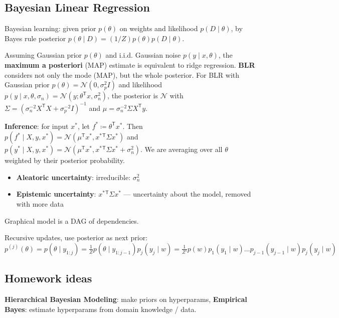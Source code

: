 \documentclass[11pt,landscape,a4paper,fleqn]{article}
\newcommand*{\tran}{^{\mathsf{T}}} %
\begin{document}
\begin{multicols*}{4}
\section{Bayesian Linear Regression}

Bayesian learning: given prior \(p(\theta)\) on weights and likelihood \(p(D \mid \theta)\),
by Bayes rule posterior \(p(\theta \mid D) = (1 / Z) p(\theta) p(D \mid \theta)\).

Assuming Gaussian prior \(p(\theta)\) and i.i.d. Gaussian noise \(p(y \mid x, \theta)\),
the \textbf{maximum a posteriori} (MAP) estimate is equivalent to ridge regression.
\textbf{BLR} considers not only the mode (MAP), but the whole posterior.
For BLR with Gaussian prior \(p(\theta) = \mathcal{N}(0, \sigma_p^2 I)\)
and likelihood \(p(y \mid x, \theta, \sigma_n) = \mathcal{N}(y; \theta\tran x, \sigma_n^2)\),
the posterior is \(\mathcal{N}\) with 
\(\Sigma = (\sigma_n^{-2} X\tran X + \sigma_p^{-2} I)^{-1}\) and
\(\mu = \sigma_n^{-2} \Sigma X\tran y\).

\textbf{Inference}: for input \(x^*\), let \(f^* \coloneqq \theta\tran x^*\).
Then \(p(f^* \mid X, y, x^*) = \mathcal{N}(\mu\tran x^*, x^*{}\tran \Sigma x^*)\)
and \(p(y^* \mid X, y, x^*) = \mathcal{N}(\mu\tran x^*, x^*{}\tran \Sigma x^* + \sigma_n^2)\).
We are averaging over all \(\theta\) weighted by their posterior probability.

\begin{itemize}
    \item \textbf{Aleatoric uncertainty}: irreducible: \(\sigma_n^2\)
    \item \textbf{Epistemic uncertainty}: \(x^*{}\tran \Sigma x^*\) --- uncertainty about the model, removed with more data
\end{itemize}

Graphical model is a DAG of dependencies.

Recursive updates, use posterior as next prior: \(p^{(j)}(\theta) = p(\theta \mid y_{1:j}) = \frac{1}{Z} p(\theta \mid y_{1:j - 1}) p_j(y_j \mid w) =
\frac{1}{Z'} p(w) p_1(y_1 \mid w) \dots p_{j-1}(y_{j-1} \mid w) p_j(y_j \mid w)\)

\subsection{Homework ideas}

\textbf{Hierarchical Bayesian Modeling}: make priors on hyperparams,
\textbf{Empirical Bayes}: estimate hyperparams from domain knowledge / data.


\end{multicols*}
\end{document}
